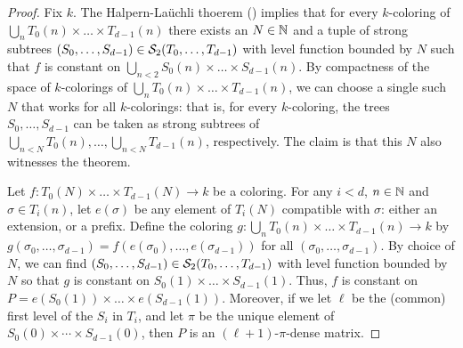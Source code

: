 \begin{proof}
  Fix $k$. The Halpern-La\"{u}chli thoerem () implies that for every $k$-coloring of $\bigcup_n T_0(n)\times\dots\times T_{d-1}(n)$ there exists an $N \in \mathbb{N}$ and a tuple of strong subtrees $(S_0,\ldots,S_{d-1}) \in \mathcal{S}_{2}({T_0,\ldots,T_{d-1}})$ with level function bounded by $N$ such that $f$ is constant on $\bigcup_{n<2}S_0(n)\times\dots\times S_{d-1}(n)$. By compactness of the space of $k$-colorings of $\bigcup_n T_0(n)\times\dots\times T_{d-1}(n)$, we can choose a single such $N$ that works for all $k$-colorings: that is, for every $k$-coloring, the trees $S_0,\dots, S_{d-1}$ can be taken as strong subtrees of $\bigcup_{n<N} T_0(n),\dots,\bigcup_{n<N} T_{d-1}(n)$, respectively. The claim is that this $N$ also witnesses the theorem.

  Let $f: T_0(N) \times \dots \times T_{d-1}(N) \to k$ be a coloring. For any $i<d$, $n\in\mathbb{N}$ and $\sigma\in T_i(n)$, let $e(\sigma)$ be any element of $T_i(N)$ compatible with $\sigma$: either an extension, or a prefix. Define the coloring $g: \bigcup_{n} T_0(n) \times \dots \times T_{d-1}(n) \to k$ by $g(\sigma_0,\ldots,\sigma_{d-1}) = f(e(\sigma_0),\ldots,e(\sigma_{d-1}))$ for all $(\sigma_0,\ldots,\sigma_{d-1})$.
  By choice of $N$, we can find $(S_0,\ldots,S_{d-1}) \in \mathcal{S}_{2}({T_0,\ldots,T_{d-1}})$ with level function bounded by $N$ so that $g$ is constant on $S_0(1)\times\dots\times S_{d-1}(1)$. Thus, $f$ is constant on $P = e(S_0(1))\times\dots\times e(S_{d-1}(1))$. Moreover, if we let $\ell$ be the (common) first level of the $S_i$ in $T_i$, and let $\pi$ be the unique element of $S_0(0) \times \cdots \times S_{d-1}(0)$, then $P$ is an $(\ell+1)$-$\pi$-dense matrix.
\end{proof}

